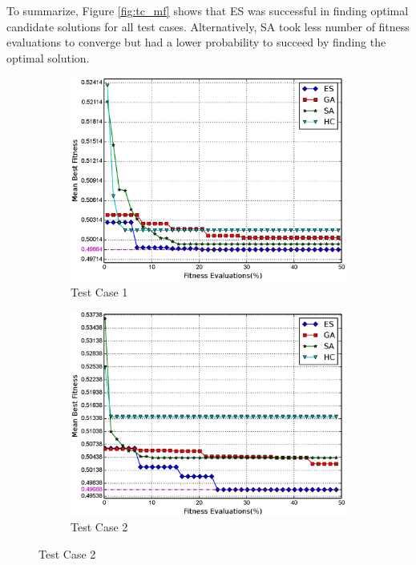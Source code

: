 \documentclass[conference]{IEEEtran}
\begin{document}
To summarize, Figure \ref{fig:tc_mf} shows that ES was successful in finding optimal candidate solutions for all test cases. Alternatively, SA took less number of fitness evaluations to converge but had a lower probability to succeed by finding the optimal solution.
\begin{figure}
    \centering
    \begin{subfigure}{\columnwidth}
        \includegraphics[width=\columnwidth]{FIG/tc1_mf.eps}%
        \caption{Test Case 1}%
    \label{fig:tc1_mf}%
    \end{subfigure}\hfill%
    \begin{subfigure}{\columnwidth}
        \includegraphics[width=\columnwidth]{FIG/tc2_mf.eps}%
        \caption{Test Case 2}%

\end{subfigure}
\end{figure}
\end{document}
